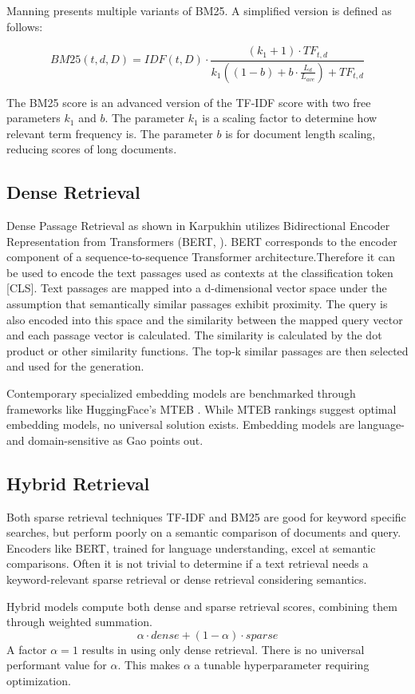 Manning \cite{Manning.2009} presents multiple variants of BM25. A simplified version is defined as follows:

$$BM25(t, d, D) = IDF(t, D) \cdot \frac{(k_1 + 1) \cdot TF_{t, d}}{k_1((1-b)+b \cdot \frac{L_d}{L_{ave}}) + TF_{t, d}}$$


The BM25 score is an advanced version of the TF-IDF score with two free parameters $k_1$ and $b$. The parameter $k_1$ is a scaling factor to determine how relevant term frequency is. The parameter $b$ is for document length scaling, reducing scores of long documents. 

\subsection{Dense Retrieval}
\label{sec:dense_retrieval}

Dense Passage Retrieval as shown in Karpukhin \cite{karpukhin2020densepassageretrievalopendomain} utilizes Bidirectional Encoder Representation from Transformers (BERT, \cite{devlin2019bertpretrainingdeepbidirectional}). BERT corresponds to the encoder component of a sequence-to-sequence Transformer architecture.Therefore it can be used to encode the text passages used as contexts at the classification token [CLS]. Text passages are mapped into a d-dimensional vector space under the assumption that semantically similar passages exhibit proximity. The query is also encoded into this space and the similarity between the mapped query vector and each passage vector is calculated. The similarity is calculated by the dot product or other similarity functions. The top-k similar passages are then selected and used for the generation.

Contemporary specialized embedding models are benchmarked through frameworks like HuggingFace's MTEB \cite{muennighoff2022mteb}. While MTEB rankings suggest optimal embedding models, no universal solution exists. Embedding models are language- and domain-sensitive as Gao \cite{Gao.18.12.2023} points out. 

\subsection{Hybrid Retrieval}
\label{sec:hybrid_retrieval}

Both sparse retrieval techniques TF-IDF and BM25 are good for keyword specific searches, but perform poorly on a semantic comparison of documents and query. Encoders like BERT, trained for language understanding, excel at semantic comparisons. Often it is not trivial to determine if a text retrieval needs a keyword-relevant sparse retrieval or dense retrieval considering semantics.

Hybrid models compute both dense and sparse retrieval scores, combining them through weighted summation.
$$\alpha \cdot dense+(1 - \alpha )\cdot sparse$$ A factor $\alpha=1$ results in using only dense retrieval. There is no universal performant value for $\alpha$. This makes $\alpha$ a tunable hyperparameter requiring optimization.
